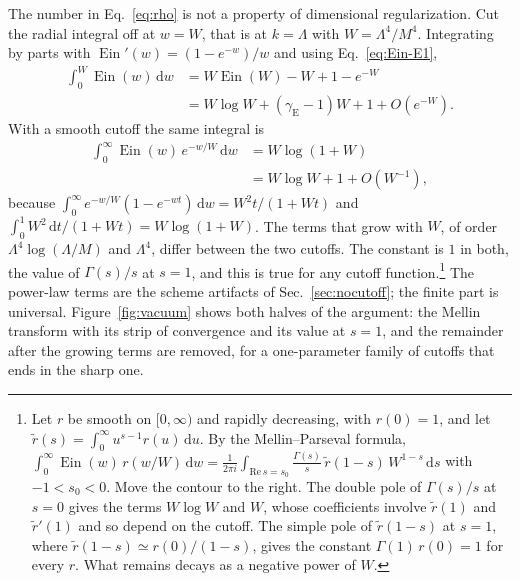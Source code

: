 \documentclass[aps,prd,10pt,twocolumn,superscriptaddress,nofootinbib,floatfix,longbibliography]{revtex4-2}
\newcommand{\dd}{\mathrm{d}}
\newcommand{\Ein}{\operatorname{Ein}}
\newcommand{\gE}{\gamma_{\mathrm E}}
\begin{document}
The number in Eq.~\eqref{eq:rho} is not a property of dimensional regularization. Cut the radial integral off at $w=W$, that is at $k=\Lambda$ with $W=\Lambda^4/M^4$. Integrating by parts with $\Ein'(w)=(1-e^{-w})/w$ and using Eq.~\eqref{eq:Ein-E1},
\begin{align*}
\int_0^W\Ein(w)\,\dd w&=W\Ein(W)-W+1-e^{-W}\\
&=W\log W+(\gE-1)W+1+O(e^{-W}).
\end{align*}
With a smooth cutoff the same integral is
\begin{align*}
\int_0^\infty\Ein(w)\,e^{-w/W}\,\dd w&=W\log(1+W)\\
&=W\log W+1+O(W^{-1}),
\end{align*}
because $\int_0^\infty e^{-w/W}(1-e^{-wt})\,\dd w=W^2t/(1+Wt)$ and $\int_0^1W^2\,\dd t/(1+Wt)=W\log(1+W)$. The terms that grow with $W$, of order $\Lambda^4\log(\Lambda/M)$ and $\Lambda^4$, differ between the two cutoffs. The constant is $1$ in both, the value of $\Gamma(s)/s$ at $s=1$, and this is true for any cutoff function.\footnote{Let $r$ be smooth on $[0,\infty)$ and rapidly decreasing, with $r(0)=1$, and let $\tilde r(s)=\int_0^\infty u^{s-1}r(u)\,\dd u$. By the Mellin--Parseval formula, $\int_0^\infty\Ein(w)\,r(w/W)\,\dd w=\frac1{2\pi i}\int_{\mathrm{Re}\,s=s_0}\frac{\Gamma(s)}s\,\tilde r(1-s)\,W^{1-s}\,\dd s$ with $-1<s_0<0$. Move the contour to the right. The double pole of $\Gamma(s)/s$ at $s=0$ gives the terms $W\log W$ and $W$, whose coefficients involve $\tilde r(1)$ and $\tilde r'(1)$ and so depend on the cutoff. The simple pole of $\tilde r(1-s)$ at $s=1$, where $\tilde r(1-s)\simeq r(0)/(1-s)$, gives the constant $\Gamma(1)\,r(0)=1$ for every $r$. What remains decays as a negative power of $W$.} The power-law terms are the scheme artifacts of Sec.~\ref{sec:nocutoff}; the finite part is universal. Figure~\ref{fig:vacuum} shows both halves of the argument: the Mellin transform with its strip of convergence and its value at $s=1$, and the remainder after the growing terms are removed, for a one-parameter family of cutoffs that ends in the sharp one.
\end{document}
